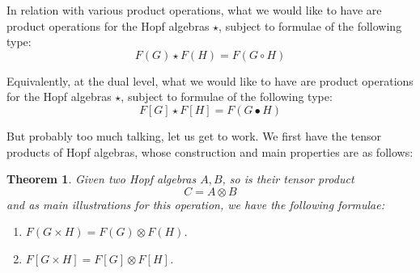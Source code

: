 \documentclass[12pt]{amsbook}
\newtheorem{theorem}{Theorem}[chapter]
\begin{document}
\bigskip

In relation with various product operations, what we would like to have are product operations for the Hopf algebras $\star$, subject to formulae of the following type:
$$F(G)\star F(H)=F(G\circ H)$$

Equivalently, at the dual level, what we would like to have are product operations for the Hopf algebras $\star$, subject to formulae of the following type:
$$F[G]\star F[H]=F(G\bullet H)$$

But probably too much talking, let us get to work. We first have the tensor products of Hopf algebras, whose construction and main properties are as follows:


\begin{theorem}
Given two Hopf algebras $A,B$, so is their tensor product 
$$C=A\otimes B$$
and as main illustrations for this operation, we have the following formulae:
\begin{enumerate}
\item $F(G\times H)=F(G)\otimes F(H)$.

\item $F[G\times H]=F[G]\otimes F[H]$.
\end{enumerate}
\end{theorem}
\end{document}
